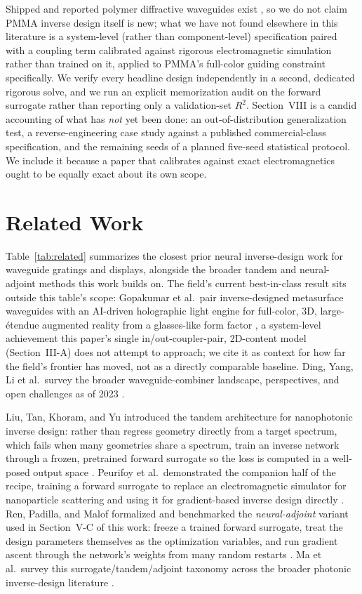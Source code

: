 \documentclass[10pt,twocolumn]{article}
\begin{document}
Shipped and reported polymer diffractive waveguides exist
\cite{nilsen2025}, so we do not claim PMMA inverse design itself is new;
what we have not found elsewhere in this literature is a system-level
(rather than component-level) specification paired with a coupling term
calibrated against rigorous electromagnetic simulation rather than trained
on it, applied to PMMA's full-color guiding constraint specifically. We
verify every headline design independently in a
second, dedicated rigorous solve, and we run an explicit memorization audit
on the forward surrogate rather than reporting only a validation-set
$R^2$. Section~VIII is a candid accounting of what has \emph{not} yet been
done: an out-of-distribution generalization test, a
reverse-engineering case study against a published commercial-class
specification, and the remaining seeds of a planned five-seed statistical
protocol. We include it because a paper that calibrates against exact
electromagnetics ought to be equally exact about its own scope.

\section{Related Work}

Table~\ref{tab:related} summarizes the closest prior neural inverse-design
work for waveguide gratings and displays, alongside the broader tandem and
neural-adjoint methods this work builds on. The field's current
best-in-class result sits outside this table's scope: Gopakumar et al.\
pair inverse-designed metasurface waveguides with an AI-driven holographic
light engine for full-color, 3D, large-\'etendue augmented reality from a
glasses-like form factor \cite{gopakumar2024}, a system-level achievement
this paper's single in/out-coupler-pair, 2D-content model (Section~III-A)
does not attempt to approach; we cite it as context for how far the
field's frontier has moved, not as a directly comparable baseline. Ding,
Yang, Li et al.\ survey the broader waveguide-combiner landscape,
perspectives, and open challenges as of 2023 \cite{ding2023elight}.

Liu, Tan, Khoram, and Yu introduced the tandem architecture for
nanophotonic inverse design: rather than regress geometry directly from a
target spectrum, which fails when many geometries share a spectrum, train
an inverse network through a frozen, pretrained forward surrogate so the
loss is computed in a well-posed output space \cite{liu2018}. Peurifoy et
al.\ demonstrated the companion half of the recipe, training a forward
surrogate to replace an electromagnetic simulator for nanoparticle
scattering and using it for gradient-based inverse design directly
\cite{peurifoy2018}. Ren, Padilla, and Malof formalized and benchmarked the
\emph{neural-adjoint} variant used in Section~V-C of this work: freeze a
trained forward surrogate, treat the design parameters themselves as the
optimization variables, and run gradient ascent through the network's
weights from many random restarts \cite{ren2020}. Ma et al.\ survey this
surrogate/tandem/adjoint taxonomy across the broader photonic
inverse-design literature \cite{ma2021}.
\end{document}

